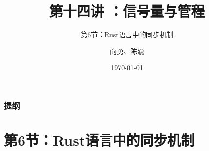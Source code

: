 


\title[第1讲]{第十四讲 ：信号量与管程} %
\subtitle{第6节：Rust语言中的同步机制}
\author{向勇、陈渝} %
\date{\today} %




\begin{frame}
\titlepage %
\end{frame}

\begin{frame}
\frametitle{提纲} %
\tableofcontents %
\end{frame}
\section{第6节：Rust语言中的同步机制} %
